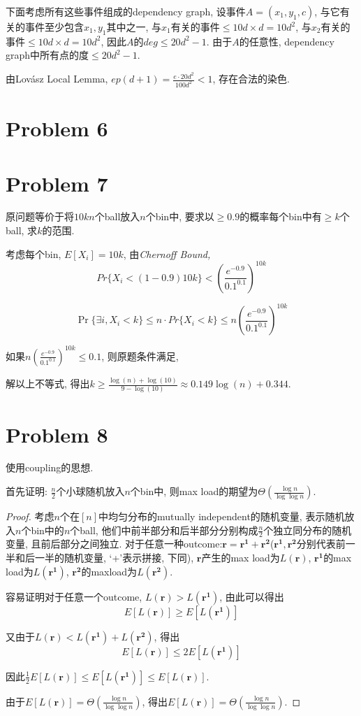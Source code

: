 \documentclass[paper=a4, fontsize=11pt]{scrartcl} %
\numberwithin{equation}{section} %
\numberwithin{figure}{section} %
\numberwithin{table}{section} %
\begin{document}
下面考虑所有这些事件组成的dependency graph, 设事件$A = (x_1, y_1, c)$, 与它有关的事件至少包含$x_1, y_1$其中之一, 与$x_1$有关的事件$\leq 10d \times d = 10d^2$, 与$x_2$有关的事件$\leq 10d \times d = 10d^2$, 因此$A$的$deg\leq 20d^2 - 1$. 由于$A$的任意性, dependency graph中所有点的度$\leq 20d^2 - 1$.	

由Lov\'asz Local Lemma, $ep(d+1) = \frac{e\cdot20d^2}{100d^2} < 1$, 存在合法的染色.

\section*{Problem 6}

\section*{Problem 7}
原问题等价于将$10kn$个ball放入$n$个bin中, 要求以$\geq 0.9$的概率每个bin中有$\geq k$个ball, 求$k$的范围.

考虑每个bin, $E[X_i] = 10k$, 由\it{Chernoff Bound}\rm, $$Pr\{X_i< (1 - 0.9) 10k\} < \left(\frac{e^{-0.9}}{0.1 ^ {0.1}}\right)^{10k}$$

$$\Pr\{\exists i, X_i < k \} \leq n\cdot Pr\{X_i < k\} \leq n\left(\frac{e^{-0.9}}{0.1 ^ {0.1}}\right)^{10k} $$

如果$n\left(\frac{e^{-0.9}}{0.1 ^ {0.1}}\right)^{10k} \leq 0.1$, 则原题条件满足,

解以上不等式, 得出$k \geq \frac{\log(n) + \log(10)}{9 - \log(10)} \approx 0.149 \log(n) + 0.344$.

\section*{Problem 8}
使用coupling的思想.

首先证明: $\frac{n}{2}$个小球随机放入$n$个bin中, 则max load的期望为$\Theta\left(\frac{\log n}{\log\log n}\right)$.

\begin{proof}
考虑$n$个在$[n]$中均匀分布的mutually independent的随机变量, 表示随机放入$n$个bin中的$n$个ball, 他们中前半部分和后半部分分别构成$\frac{n}{2}$个独立同分布的随机变量, 且前后部分之间独立. 对于任意一种outcome:$\mathbf{r} = \mathbf{r^1} + \mathbf{r^2}$($\mathbf{r^1},\mathbf{r^2}$分别代表前一半和后一半的随机变量, `+'表示拼接, 下同), $\mathbf{r}$产生的max load为$L(\mathbf{r})$, $\mathbf{r^1}$的max load为$L(\mathbf{r^1})$, $\mathbf{r^2}$的maxload为$L(\mathbf{r^2})$.

容易证明对于任意一个outcome, $L(\mathbf{r}) > L(\mathbf{r^1})$, 由此可以得出
$$E[L(\mathbf{r})] \geq E[L(\mathbf{r^1})]$$

又由于$L(\mathbf{r}) < L(\mathbf{r^1}) + L(\mathbf{r^2})$, 得出
$$E[L(\mathbf{r})] \leq 2E[L(\mathbf{r^1})] $$

因此$\frac{1}{2}E[L(\mathbf{r})] \leq E[L(\mathbf{r^1})] \leq E[L(\mathbf{r})]$.

由于$E[L(\mathbf{r})] = \Theta\left(\frac{\log n}{\log\log n}\right)$, 得出$E[L(\mathbf{r})] = \Theta\left(\frac{\log n}{\log\log n}\right)$.
\end{proof}
\end{document}
